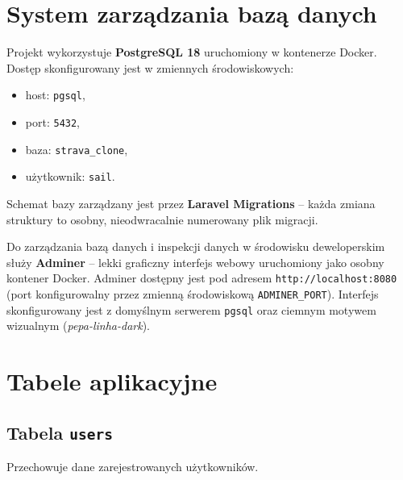 \documentclass[12pt,a4paper]{report}
\begin{document}
\section{System zarządzania bazą danych}

Projekt wykorzystuje \textbf{PostgreSQL 18} uruchomiony w kontenerze Docker. Dostęp skonfigurowany jest w zmiennych środowiskowych:
\begin{itemize}[noitemsep]
    \item host: \texttt{pgsql},
    \item port: \texttt{5432},
    \item baza: \texttt{strava\_clone},
    \item użytkownik: \texttt{sail}.
\end{itemize}

Schemat bazy zarządzany jest przez \textbf{Laravel Migrations} -- każda zmiana struktury to osobny, nieodwracalnie numerowany plik migracji.

Do zarządzania bazą danych i inspekcji danych w środowisku deweloperskim służy \textbf{Adminer} -- lekki graficzny interfejs webowy uruchomiony jako osobny kontener Docker. Adminer dostępny jest pod adresem \texttt{http://localhost:8080} (port konfigurowalny przez zmienną środowiskową \texttt{ADMINER\_PORT}). Interfejs skonfigurowany jest z domyślnym serwerem \texttt{pgsql} oraz ciemnym motywem wizualnym (\textit{pepa-linha-dark}).

\section{Tabele aplikacyjne}

\subsection{Tabela \texttt{users}}

Przechowuje dane zarejestrowanych użytkowników.
\end{document}
